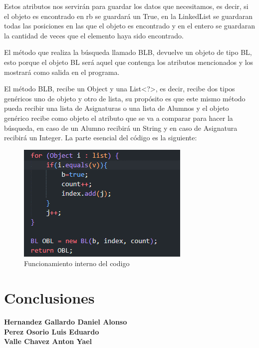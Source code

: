 \documentclass{report}
\begin{document}
Estos atributos nos servirán para guardar los datos que necesitamos, es decir, si el objeto es encontrado en rb se guardará un True, en la LinkedList se guardaran todas las posiciones en las que el objeto es encontrado y en el entero se guardaran la cantidad de veces que el elemento haya sido encontrado.

El método que realiza la búsqueda llamado BLB, devuelve un objeto de tipo BL, esto porque el objeto BL será aquel que contenga los atributos mencionados y los mostrará como salida en el programa.

El método BLB, recibe un Object y una List<?>, es decir, recibe dos tipos genéricos uno de objeto y otro de lista, su propósito es que este mismo método pueda recibir una lista de Asignaturas o una lista de Alumnos y el objeto genérico recibe como objeto el atributo que se va a comparar para hacer la búsqueda, en caso de un Alumno recibirá un String y en caso de Asignatura recibirá un Integer.
La parte esencial del código es la siguiente:
\begin{figure}[h]
    \centering
    \includegraphics[width=0.75\linewidth]{Imagen2.png}
    \caption{Funcionamiento interno del codigo}
    \label{fig:enter-label}
\end{figure}


\chapter{Conclusiones}
\textbf{Hernandez Gallardo Daniel Alonso} \\
\newpage
\textbf{Perez Osorio Luis Eduardo} \\

\newpage
\textbf{Valle Chavez Anton Yael} \\
\newpage
\nocite{*}
  \newpage

\end{document}
